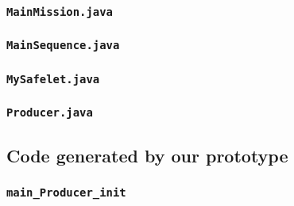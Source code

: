 \begin{landscape}
\begin{multicols}{2}
\subsubsection{\texttt{MainMission.java}}


\subsubsection{\texttt{MainSequence.java}}


\subsubsection{\texttt{MySafelet.java}}


\subsubsection{\texttt{Producer.java}}


\subsection{Code generated by our prototype}
\label{Buffer-code-our-subsection}

\subsubsection{\texttt{main\_Producer\_init}}


\end{multicols}
\end{landscape}
